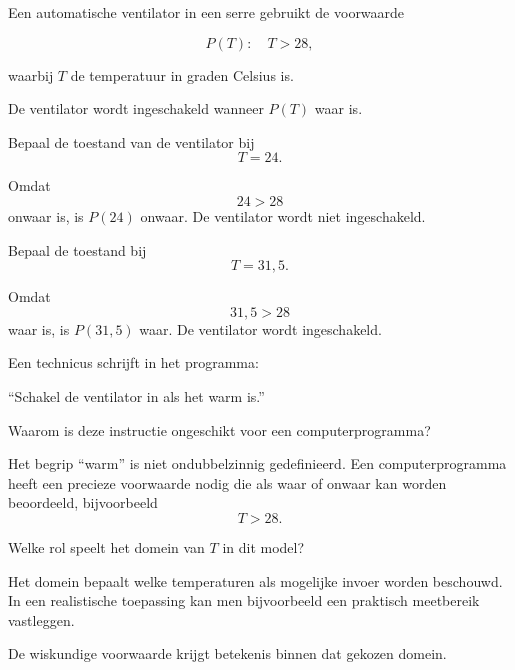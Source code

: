 \documentclass{ximera}
\begin{document}
\begin{oefening}{\oefU}

Een automatische ventilator in een serre gebruikt de voorwaarde

\[
P(T):\quad T>28,
\]

waarbij $T$ de temperatuur in graden Celsius is.

De ventilator wordt ingeschakeld wanneer $P(T)$ waar is.

\begin{question}
Bepaal de toestand van de ventilator bij
\[
T=24.
\]

\begin{oplossing}
Omdat
\[
24>28
\]
onwaar is, is $P(24)$ onwaar. De ventilator wordt niet ingeschakeld.
\end{oplossing}
\end{question}


\begin{question}
Bepaal de toestand bij
\[
T=31{,}5.
\]

\begin{oplossing}
Omdat
\[
31{,}5>28
\]
waar is, is $P(31{,}5)$ waar. De ventilator wordt ingeschakeld.
\end{oplossing}
\end{question}


\begin{question}
Een technicus schrijft in het programma:

\begin{center}
``Schakel de ventilator in als het warm is.''
\end{center}

Waarom is deze instructie ongeschikt voor een computerprogramma?

\begin{oplossing}
Het begrip ``warm'' is niet ondubbelzinnig gedefinieerd.
Een computerprogramma heeft een precieze voorwaarde nodig die als
waar of onwaar kan worden beoordeeld, bijvoorbeeld
\[
T>28.
\]
\end{oplossing}
\end{question}


\begin{question}
Welke rol speelt het domein van $T$ in dit model?

\begin{oplossing}
Het domein bepaalt welke temperaturen als mogelijke invoer worden
beschouwd. In een realistische toepassing kan men bijvoorbeeld een
praktisch meetbereik vastleggen.

De wiskundige voorwaarde krijgt betekenis binnen dat gekozen domein.
\end{oplossing}
\end{question}

\end{oefening}
\end{document}
